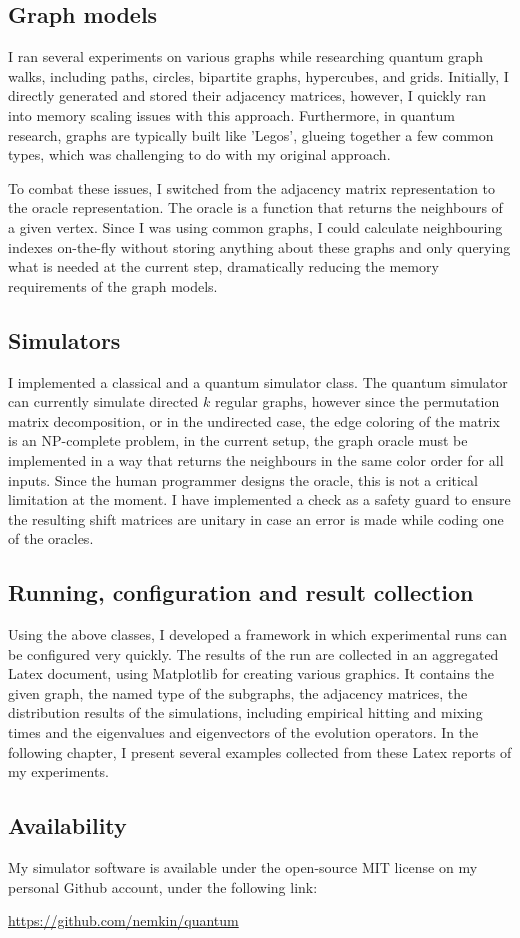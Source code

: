 \subsection{Graph models}

I ran several experiments on various graphs while researching quantum graph walks, including paths, circles, bipartite graphs, hypercubes, and grids. Initially, I directly generated and stored their adjacency matrices, however, I quickly ran into memory scaling issues with this approach. Furthermore, in quantum research, graphs are typically built like 'Legos', glueing together a few common types, which was challenging to do with my original approach.

To combat these issues, I switched from the adjacency matrix representation to the oracle representation. The oracle is a function that returns the neighbours of a given vertex. Since I was using common graphs, I could calculate neighbouring indexes on-the-fly without storing anything about these graphs and only querying what is needed at the current step, dramatically reducing the memory requirements of the graph models.

\subsection{Simulators}

I implemented a classical and a quantum simulator class. The quantum simulator can currently simulate directed $k$ regular graphs, however since the permutation matrix decomposition, or in the undirected case, the edge coloring of the matrix is an NP-complete problem, in the current setup, the graph oracle must be implemented in a way that returns the neighbours in the same color order for all inputs. Since the human programmer designs the oracle, this is not a critical limitation at the moment. I have implemented a check as a safety guard to ensure the resulting shift matrices are unitary in case an error is made while coding one of the oracles.

\subsection{Running, configuration and result collection}

Using the above classes, I developed a framework in which experimental runs can be configured very quickly. The results of the run are collected in an aggregated Latex document, using Matplotlib for creating various graphics. It contains the given graph, the named type of the subgraphs, the adjacency matrices, the distribution results of the simulations, including empirical hitting and mixing times and the eigenvalues and eigenvectors of the evolution operators. In the following chapter, I present several examples collected from these Latex reports of my experiments.

\subsection{Availability}

My simulator software is available under the open-source MIT license on my personal Github account, under the following link:

\url{https://github.com/nemkin/quantum}

